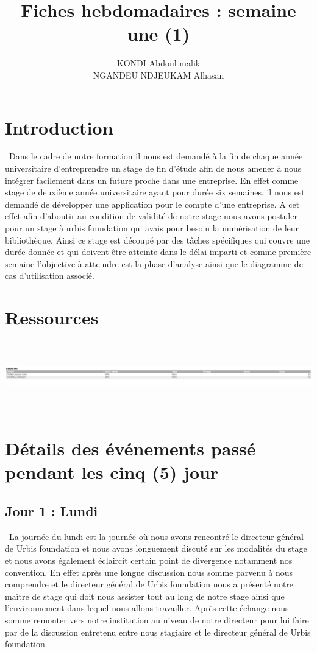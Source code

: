 \documentclass[12pt,a4paper]{article}
\author{KONDI Abdoul malik \\ NGANDEU NDJEUKAM Alhasan}
\title{Fiches hebdomadaires : semaine une (1)}
\begin{document}
\maketitle
\tableofcontents
\newpage

\section{Introduction}
\ Dans le cadre de notre formation il nous est demandé à la fin de chaque année universitaire d’entreprendre un stage de fin d’étude afin de nous amener à nous intégrer facilement dans un future proche dans une entreprise. En effet comme stage de deuxième année universitaire ayant pour durée six semaines, il nous est demandé de développer une application pour le compte d’une entreprise. A cet effet afin d’aboutir au condition de validité de notre stage nous avons postuler pour un stage à urbis foundation qui avais pour besoin la numérisation de leur bibliothèque. Ainsi ce stage est découpé par des tâches spécifiques qui couvre une durée donnée et qui doivent être atteinte dans le délai imparti et comme première semaine l’objective à atteindre est la phase d’analyse ainsi que le diagramme de cas d’utilisation associé.
\section{Ressources}
\includegraphics[height=3cm,width=16cm]{images/resources.png}
\section{Détails des événements passé pendant les cinq (5) jour}
\subsection{Jour 1 : Lundi}

\ La journée du lundi est la journée où nous avons rencontré le directeur général de Urbis foundation et nous avons longuement discuté sur les modalités du stage et nous avons également éclaircit certain point de divergence notamment nos convention. En effet après une longue discussion nous somme parvenu à nous comprendre et le directeur général de Urbis foundation nous a présenté notre maître de stage qui doit nous assister tout au long de notre stage ainsi que l’environnement dans lequel nous allons travailler. Après cette échange nous somme remonter vers notre institution au niveau de notre directeur pour lui faire par de la discussion entretenu entre nous stagiaire et le directeur général de Urbis foundation. 
\end{document}

